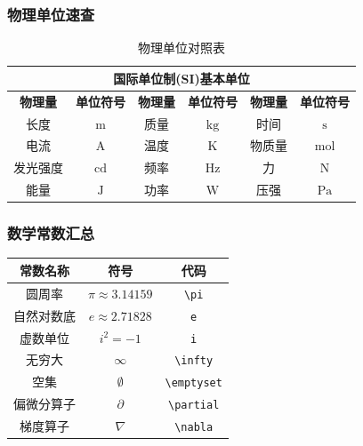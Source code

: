 \documentclass{article}
\begin{document}
\subsubsection{物理单位速查}
\begin{table}[H]
      \centering
      \renewcommand{\arraystretch}{1.3}
      \begin{tabular}{||c|c||c|c||c|c||}
            \hline\hline
            \multicolumn{6}{||c||}{\textbf{国际单位制(SI)基本单位}}                                             \\
            \hline\hline
            \textbf{物理量} & \textbf{单位符号} & \textbf{物理量} & \textbf{单位符号} & \textbf{物理量} & \textbf{单位符号} \\
            \hline
            长度           & $\text{m}$    & 质量           & $\text{kg}$   & 时间           & $\text{s}$    \\
            \hline
            电流           & $\text{A}$    & 温度           & $\text{K}$    & 物质量          & $\text{mol}$  \\
            \hline
            发光强度         & $\text{cd}$   & 频率           & $\text{Hz}$   & 力            & $\text{N}$    \\
            \hline
            能量           & $\text{J}$    & 功率           & $\text{W}$    & 压强           & $\text{Pa}$   \\
            \hline\hline
      \end{tabular}
      \caption{物理单位对照表}
\end{table}

\subsubsection{数学常数汇总}
\begin{center}
      \large
      \begin{tabular}{@{}ccc@{}}
            \toprule
            \textbf{常数名称} & \textbf{符号}           & \textbf{代码}      \\
            \midrule
            圆周率           & $\pi \approx 3.14159$ & \verb|\pi|       \\
            自然对数底         & $e \approx 2.71828$   & \verb|e|         \\
            虚数单位          & $i^2 = -1$            & \verb|i|         \\
            无穷大           & $\infty$              & \verb|\infty|    \\
            空集            & $\emptyset$           & \verb|\emptyset| \\
            偏微分算子         & $\partial$            & \verb|\partial|  \\
            梯度算子          & $\nabla$              & \verb|\nabla|    \\
            \bottomrule
      \end{tabular}
\end{center}
\end{document}

